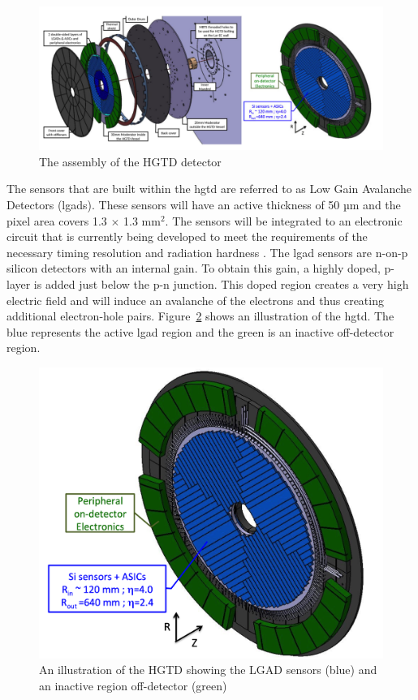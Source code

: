 \begin{figure}[ht]
  \centering
  \includegraphics[scale=0.4]{figs/ch3/hgtd_assem.png}
  \caption{ The assembly of the HGTD detector\cite{hgtd}}
\label{fig:3.16}
\end{figure}

The sensors that are built within the \gls{hgtd} are referred to as Low Gain Avalanche Detectors (\gls{lgad}s). 
These sensors will have an active thickness of 50 µm and the pixel area covers 1.3 $\times$ 1.3 $\textrm{mm}^{\textrm{2}}$. The 
sensors will be integrated to an electronic circuit that is currently being developed to meet the requirements of the necessary 
timing resolution and radiation hardness \cite{hgtd}. The \gls{lgad} sensors are n-on-p silicon detectors with an internal gain. 
To obtain this gain, a highly doped, p-layer is added just below the p-n junction. This doped region creates a very high electric 
field and will induce an avalanche of the electrons and thus creating additional electron-hole pairs. Figure~\ref{fig:3.17} shows an illustration 
of the \gls{hgtd}. The blue represents the active \gls{lgad} region and the green is an inactive off-detector region.

\begin{figure}[H]
  \centering
  \includegraphics[scale=0.4]{figs/ch3/hgtd_disc.png}
  \caption{ An illustration of the HGTD showing the LGAD sensors (blue) and an inactive region off-detector (green) \cite{hgtd}}
\label{fig:3.17}
\end{figure}

